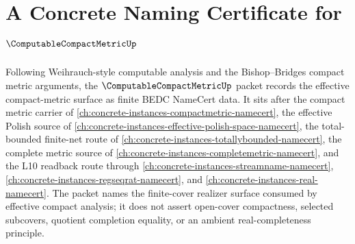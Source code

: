 \chapter{A Concrete Naming Certificate for $\ComputableCompactMetricUp$}
\label{ch:concrete-instances-computable-compact-metric-namecert}

Following Weihrauch-style computable analysis and the Bishop--Bridges compact metric arguments, the $\ComputableCompactMetricUp$ packet records the effective compact-metric surface as finite BEDC NameCert data. It sits after the compact metric carrier of \autoref{ch:concrete-instances-compactmetric-namecert}, the effective Polish source of \autoref{ch:concrete-instances-effective-polish-space-namecert}, the total-bounded finite-net route of \autoref{ch:concrete-instances-totallybounded-namecert}, the complete metric source of \autoref{ch:concrete-instances-completemetric-namecert}, and the L10 readback route through \autoref{ch:concrete-instances-streamname-namecert}, \autoref{ch:concrete-instances-regseqrat-namecert}, and \autoref{ch:concrete-instances-real-namecert}. The packet names the finite-cover realizer surface consumed by effective compact analysis; it does not assert open-cover compactness, selected subcovers, quotient completion equality, or an ambient real-completeness principle.

